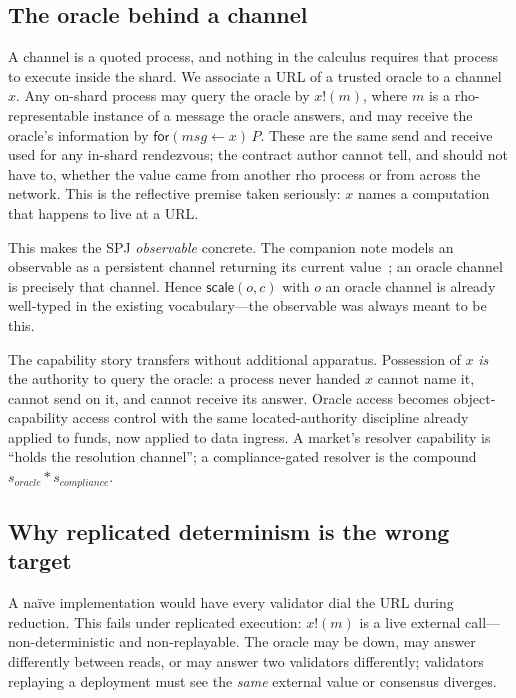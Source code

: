 \documentclass[11pt]{article}
\newcommand{\sep}{\mathbin{\ast}}
\begin{document}
\subsection{The oracle behind a channel}\label{sec:oracle-channel}

A channel is a quoted process, and nothing in the calculus requires that process to execute
inside the shard. We associate a URL of a trusted oracle to a channel $x$. Any on-shard
process may query the oracle by $x!(m)$, where $m$ is a rho-representable instance of a
message the oracle answers, and may receive the oracle's information by
$\mathsf{for}(\mathit{msg} \leftarrow x)\,P$. These are the same send and receive used for any
in-shard rendezvous; the contract author cannot tell, and should not have to, whether the
value came from another rho process or from across the network. This is the reflective
premise taken seriously: $x$ names a computation that happens to live at a URL.

This makes the SPJ \emph{observable} concrete. The companion note models an observable as a
persistent channel returning its current value~\cite[\S2.2]{finrho}; an oracle channel is
precisely that channel. Hence $\textsf{scale}(o,c)$ with $o$ an oracle channel is already
well-typed in the existing vocabulary---the observable was always meant to be this.

The capability story transfers without additional apparatus. Possession of $x$ \emph{is} the
authority to query the oracle: a process never handed $x$ cannot name it, cannot send on it,
and cannot receive its answer. Oracle access becomes object-capability access control with the
same located-authority discipline already applied to funds, now applied to data ingress. A
market's resolver capability is ``holds the resolution channel''; a compliance-gated resolver
is the compound $s_{\mathit{oracle}} \sep s_{\mathit{compliance}}$.

\subsection{Why replicated determinism is the wrong target}\label{sec:oracle-determinism}

A na\"ive implementation would have every validator dial the URL during reduction. This fails
under replicated execution: $x!(m)$ is a live external call---non-deterministic and
non-replayable. The oracle may be down, may answer differently between reads, or may answer
two validators differently; validators replaying a deployment must see the \emph{same}
external value or consensus diverges.
\end{document}
